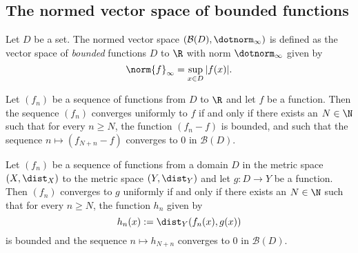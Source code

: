 \subsection{The normed vector space of bounded functions}
\begin{definition}
    Let $D$ be a set.
    The normed vector space $(\mathcal B(D),\dotnorm_\infty)$ is defined as the vector space of \emph{bounded} functions $D$ to $\R$
    with norm $\dotnorm_\infty$ given by
    $$\norm{f}_\infty = \sup_{x\in D}|f(x)|.$$
\end{definition}

\begin{proposition}
    Let $(f_n)$ be a sequence of functions from $D$ to $\R$ and let $f$ be a function. Then the sequence $(f_n)$ converges uniformly to $f$
    if and only if there exists an $N \in \N$ such that for every $n \ge N$, the function $(f_n - f)$ is bounded, and such that the
    sequence $n \mapsto (f_{N+n} - f)$ converges to 0 in $\mathcal B(D)$.
\end{proposition}

\begin{proposition}
    Let $(f_n)$ be a sequence of functions from a domain $D$ in the metric space $(X,\dist_X)$ to the metric space $(Y,\dist_Y)$
    and let $g: D \to Y$ be a function. Then $(f_n)$ converges to $g$ uniformly if and only if there exists an $N \in \N$ such
    that for every $n \ge N$, the function $h_n$ given by
    $$h_n(x) := \dist_Y(f_n(x),g(x))$$
    is bounded and the sequence $n \mapsto h_{N+n}$ converges to 0 in $\mathcal B(D)$.
\end{proposition}
